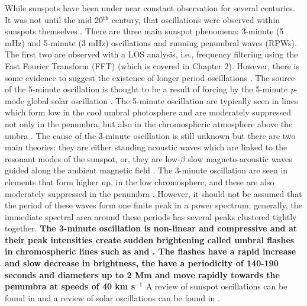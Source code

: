     While sunspots have been under near constant observation for several centuries.
    It was not until the mid 20$^{\mathrm{th}}$ century, that oscillations were observed within sunspots themselves \citep{OASO}.
    There are three main sunspot phenomena: 3-minute (5 mHz) and 5-minute (3 mHz) oscillations and running penumbral waves (RPWs).
    The first two are observed with a LOS analysis, i.e., frequency filtering using the Fast Fourier Transform (FFT) (which is covered in Chapter 2).
    However, there is some evidence to suggest the existence of longer period oscillations \citep{LPO,SOS,Chorley2011}.
    The source of the 5-minute oscillation is thought to be a result of forcing by the 5-minute \textit{p}-mode global solar oscillation \citep{OWS,WAUO}.
    The 5-minute oscillation are typically seen in lines which form low in the cool umbral photosphere and are moderately suppressed not only in the penumbra, but also in the chromospheric atmosphere above the umbra \citep{OASO}.
    The cause of the 3-minute oscillation is still unknown but there are two main theories: they are either standing acoustic waves which are linked to the resonant modes of the sunspot, or, they are low-$\beta$ slow magneto-acoustic waves guided along the ambient magnetic field \citep{UTMO,OWS,OASO,ORWS}.
    The 3-minute oscillation are seen in elements that form higher up, in the low chromosphere, and these are also moderately suppressed in the penumbra \citep{OASO}.
    However, it should not be assumed that the period of these waves form one finite peak in a power spectrum; generally, the immediate spectral area around these periods has several peaks clustered tightly together.
	\textbf{The 3-minute oscillation is non-linear and compressive and at their peak intensities create sudden brightening called umbral flashes in chromospheric lines such as  and  \citep{1969SoPh....7..351B}.
    The flashes have a rapid increase and slow decrease in brightness, the have a periodicity of 140-190 seconds and diameters up to 2 Mm and move rapidly towards the penumbra at speeds of 40 km s$^{-1}$ \citep{2003A&A...403..277R}}
    A review of sunspot oscillations can be found in \cite{OASO} and a review of solar oscillations can be found in \cite{SO}.
    

